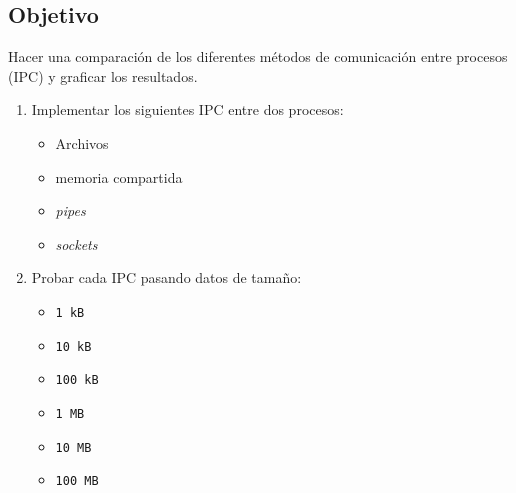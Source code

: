 \subsection{Objetivo}
Hacer una comparación de los diferentes métodos de comunicación entre
procesos (IPC) y graficar los resultados.

\begin{enumerate}\def\labelenumi{\arabic{enumi}.}
\tightlist
\item Implementar los siguientes IPC entre dos procesos:
  \begin{itemize}\tightlist
    \item Archivos
    \item memoria compartida
    \item \emph{pipes}
    \item \emph{sockets}
  \end{itemize}

\item Probar cada IPC pasando datos de tamaño:
  \begin{itemize}
    \tightlist
    \item \texttt{1\ kB}
    \item \texttt{10\ kB}
    \item \texttt{100\ kB}
    \item \texttt{1\ MB}
    \item \texttt{10\ MB}
    \item \texttt{100\ MB}
  \end{itemize}
\end{enumerate}

